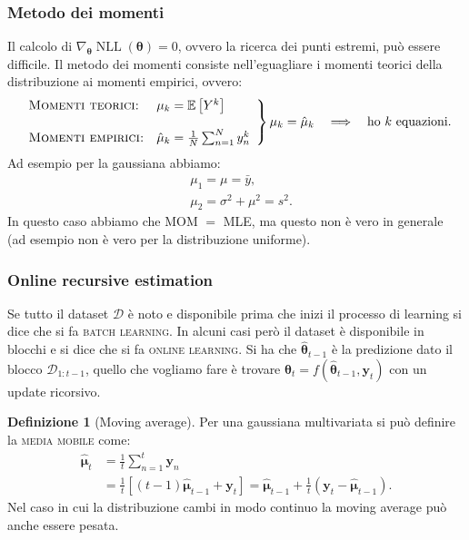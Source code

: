 \documentclass[10pt]{article}
\DeclareMathOperator{\NLL}{NLL}
\renewcommand{\vec}[1]{\boldsymbol{#1}}
\newcommand{\im}[1]{\textsc{#1}}
\newcommand{\pare}[1]{
	\ensuremath{\left(#1\right)}
}
\newcommand{\spare}[1]{
	\ensuremath{\left[#1\right]}
}
\theoremstyle{definition}
\newtheorem{definition}{Definizione}[section]
\begin{document}
\subsubsection{Metodo dei momenti}
Il calcolo di $\nabla_{\vec{\theta}}\NLL\pare{\vec{\theta}} = 0$, ovvero la ricerca dei punti estremi, può essere difficile. Il metodo dei momenti consiste nell'eguagliare i momenti teorici della distribuzione ai momenti empirici, ovvero:
\begin{equation}
\left.
\begin{array}{ll}
\textsc{Momenti teorici:} & \mu_k = \mathbb{E}\spare{Y^k} \\
\\
\textsc{Momenti empirici:} & \hat{\mu}_k = \frac{1}{N}\sum_{n=1}^N y_n^k
\end{array}
\right\} \mu_k = \hat{\mu}_k \quad\Longrightarrow\quad \text{ho } k \text{ equazioni}.
\end{equation}
Ad esempio per la gaussiana abbiamo:
\begin{align*}
&\mu_1 = \mu = \bar{y}, \\
&\mu_2 = \sigma^2 + \mu^2 = s^2.
\end{align*}
In questo caso abbiamo che MOM \(=\) MLE, ma questo non è vero in generale (ad esempio non è vero per la distribuzione uniforme).

\subsubsection{Online recursive estimation}
Se tutto il dataset $\mathcal{D}$ è noto e disponibile prima che inizi il processo di learning si dice che si fa \im{batch learning}. In alcuni casi però il dataset è disponibile in blocchi e si dice che si fa \im{online learning}. Si ha che $\hat{\vec{\theta}}_{t-1}$ è la predizione dato il blocco $\mathcal{D}_{1:t-1}$, quello che vogliamo fare è trovare $\vec{\theta}_t = f(\hat{\vec{\theta}}_{t-1}, \vec{y}_t)$ con un update ricorsivo.

\begin{definition}[Moving average]
Per una gaussiana multivariata si può definire la \im{media mobile} come:
\begin{equation}
\begin{split}
\hat{\vec{\mu}}_t &= \frac{1}{t}\sum_{n=1}^t\vec{y}_n \\
&= \frac{1}{t}\spare{\pare{t-1}\hat{\vec{\mu}}_{t-1} + \vec{y}_t} = \hat{\vec{\mu}}_{t-1} + \frac{1}{t}\pare{\vec{y}_t - \hat{\vec{\mu}}_{t-1}}.
\end{split}
\end{equation}
Nel caso in cui la distribuzione cambi in modo continuo la moving average può anche essere pesata.
\end{definition}
\end{document}
